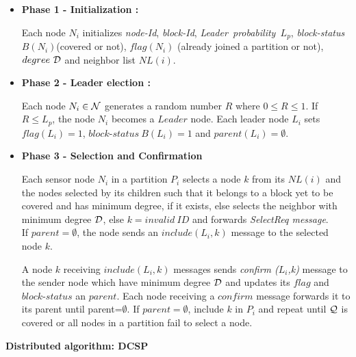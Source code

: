 \documentclass{acm_proc_article-sp}
\begin{document}
 \begin{itemize}
 \vspace{-0.4cm}
 \item {\bf Phase 1 - Initialization :}
 
           Each node $N_i $ initializes {\it node-Id}, {\it block-Id}, {\it Leader~probability~$L_p$}, {\it block-status $B(N_i)$}(covered or not), $flag(N_i)$ (already joined a partition or not), $degree \ {\cal D}$ and neighbor list $NL(i)$.
\item{\bf Phase 2 - Leader election :} 
    
      Each node $N_i\in {\cal N}$ generates a random number $R$ where $0\leq R\leq 1$. If $R \leq L_p$, the node $N_i$ becomes a $Leader$ node. Each leader node $L_i$ sets $flag(L_i)=1$, $block$-$status\ B(L_i)=1$ and $parent(L_i)=\emptyset$.
\item{\bf Phase 3 - Selection and Confirmation }

	 Each sensor node $N_i$ in a partition $P_i$ selects a node $k$ from its $NL(i)$ and the nodes selected by its children such that it belongs to a block yet to be covered and has minimum degree, if it exists, else selects the neighbor with minimum degree ${\cal D}$, else $k= invalid~ID$ and forwards {\it SelectReq message}.\\   
	If  $parent=\emptyset$, the node sends an $include(L_i, k)$ message to the selected node $k$.
        
A node $k$ receiving $include(L_i,k)$ messages sends {\it confirm ($L_i$,k)} message to the sender node which have minimum degree ${\cal D}$ and updates its $flag$ and $block$-$status$ an
$parent$. Each node receiving a $confirm$ message forwards it to its parent until parent=$\emptyset$. If $parent=\emptyset$, include $k$ in $P_i$ and repeat until ${\cal Q}$ is covered or all nodes in a partition fail to select a node.
\end{itemize}
 { \bf Distributed algorithm: DCSP}
\end{document}
